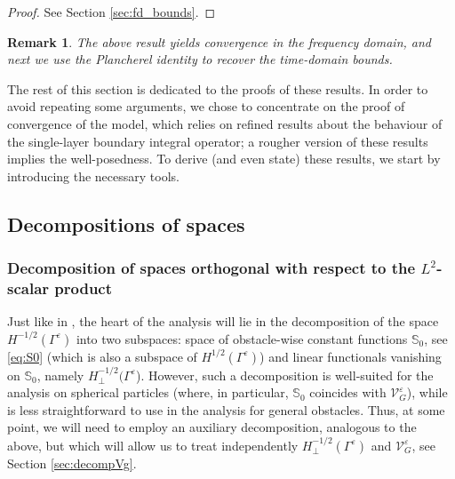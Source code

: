 \documentclass[]{article}
\newtheorem{remark}{Remark}
\numberwithin{equation}{section}
\numberwithin{theorem}{section}
\numberwithin{lemma}{section}
\numberwithin{corollary}{section}
\numberwithin{proposition}{section}
\numberwithin{definition}{section}
\newcommand{\re}{\varepsilon}
\begin{document}
	\begin{proof}
		See Section \ref{sec:fd_bounds}.
	\end{proof}
	\begin{remark}
		The above result yields convergence in the frequency domain, and next we use the Plancherel identity to recover the time-domain bounds. 
	\end{remark}
	The rest of this section is dedicated to the proofs of these results. In order to avoid repeating some arguments, we chose to concentrate on the proof of convergence of the model, which relies on refined results about the behaviour of the single-layer boundary integral operator; a rougher version of these results implies the well-posedness. To derive (and even state) these results, we start by introducing the necessary tools. 
	
	\subsection{Decompositions of spaces}
	\label{sec:orthogonal_projectors}
	\subsubsection{Decomposition of spaces orthogonal with respect to the $L^2$-scalar product}
	\label{sec:decompL2}
	Just like in \cite{MK}, the heart of the analysis will lie in the decomposition of the space $H^{-1/2}(\Gamma^{\re})$ into two subspaces: space of obstacle-wise constant functions  $\mathbb{S}_0$, see \eqref{eq:S0} (which is also a subspace of $H^{1/2}(\Gamma^{\re})$) and linear functionals vanishing on $\mathbb{S}_0$, namely $H^{-1/2}_{\perp}(\Gamma^{\re}$). However, such a decomposition is well-suited for the analysis on spherical particles (where, in particular, $\mathbb{S}_0$ coincides with $\mathcal{V}_G^{\re}$), while is less straightforward to use in the analysis for general obstacles. Thus, at some point, we will need to employ an auxiliary decomposition, analogous to the above, but which will allow us to treat independently $H^{-1/2}_{\perp}(\Gamma^{\re})$ and $\mathcal{V}^{\re}_G$, see Section \ref{sec:decompVg}.
	
\end{document}
